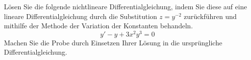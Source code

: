 \begin{atiTask}[
	title = Eine nichtlineare Differentialgleichung,
	topic = Gewöhnliche Differentialgleichungen,
	subtopic = Lineare Differentialgleichungen 1. Ordnung,
	language = Deutsch,
]
	Lösen Sie die folgende nichtlineare Differentialgleichung, indem Sie diese auf eine lineare Differentialgleichung durch die Substitution $z = y^{-2}$ zurückführen und mithilfe der Methode der Variation der Konstanten behandeln.
	\[
		y' - y + 3x^2y^3 = 0
	\]
	Machen Sie die Probe durch Einsetzen Ihrer Lösung in die ursprüngliche Differentialgleichung.
\end{atiTask}